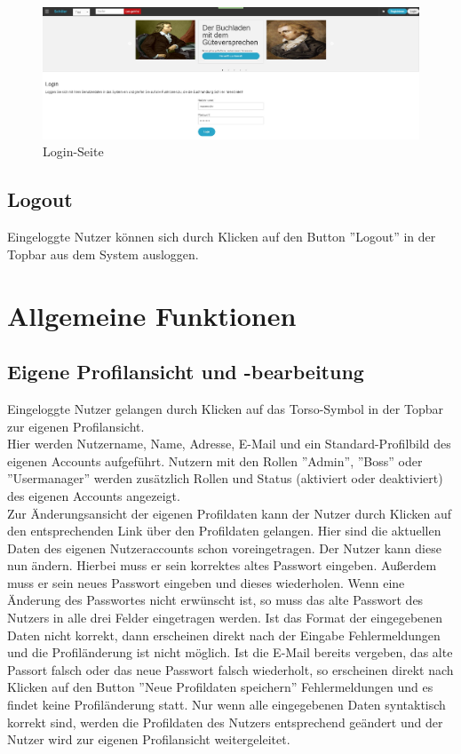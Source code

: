 \documentclass[a4paper]{article}
\begin{document}
\begin{figure}[ht]
\centering
\includegraphics[width=1.0\textwidth]{Login.jpg}
\caption{Login-Seite}
\end{figure}
\smallskip

\FloatBarrier

\subsection{Logout}

Eingeloggte Nutzer können sich durch Klicken auf den Button ''Logout'' in der Topbar aus dem System ausloggen.

\newpage

\section{Allgemeine Funktionen}

\subsection{Eigene Profilansicht und -bearbeitung} \label{profil}

Eingeloggte Nutzer gelangen durch Klicken auf das Torso-Symbol in der Topbar zur eigenen Profilansicht. \\
Hier werden Nutzername, Name, Adresse, E-Mail und ein Standard-Profilbild des eigenen Accounts aufgeführt. Nutzern mit den Rollen ''Admin'', ''Boss'' oder ''Usermanager'' werden zusätzlich Rollen und Status (aktiviert oder deaktiviert) des eigenen Accounts angezeigt. \\
Zur Änderungsansicht der eigenen Profildaten kann der Nutzer durch Klicken auf den entsprechenden Link über den Profildaten gelangen. Hier sind die aktuellen Daten des eigenen Nutzeraccounts schon voreingetragen. Der Nutzer kann diese nun ändern. Hierbei muss er sein korrektes altes Passwort eingeben. Außerdem muss er sein neues Passwort eingeben und dieses wiederholen. Wenn eine Änderung des Passwortes nicht erwünscht ist, so muss das alte Passwort des Nutzers in alle drei Felder eingetragen werden. Ist das Format der eingegebenen Daten nicht korrekt, dann erscheinen direkt nach der Eingabe Fehlermeldungen und die Profiländerung ist nicht möglich. Ist die E-Mail bereits vergeben, das alte Passort falsch oder das neue Passwort falsch wiederholt, so erscheinen direkt nach Klicken auf den Button ''Neue Profildaten speichern'' Fehlermeldungen und es findet keine Profiländerung statt. Nur wenn alle eingegebenen Daten syntaktisch korrekt sind, werden die Profildaten des Nutzers entsprechend geändert und der Nutzer wird zur eigenen Profilansicht weitergeleitet.
\end{document}
